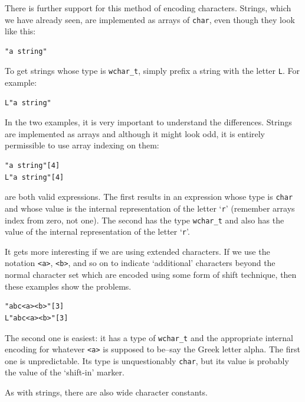     There is further support for this method of encoding characters.
     Strings, which we have already seen, are implemented as arrays of
     \texttt{char}, even though they look like this:


    \begin{Verbatim}
"a string"
\end{Verbatim}

    To get strings whose type is \texttt{wchar\_t}, simply prefix a
     string with the letter \texttt{L}. For example:


    \begin{Verbatim}
L"a string"
\end{Verbatim}

    In the two examples, it is very important to understand the
     differences. Strings are implemented as arrays and although it might look
     odd, it is entirely permissible to use array indexing on them:


    \begin{Verbatim}
"a string"[4]
L"a string"[4]
\end{Verbatim}

    are both valid expressions. The first results in an expression whose
     type is \texttt{char} and whose value is the internal representation
     of the letter `\texttt{r}' (remember arrays index from
     zero, not one). The second has the type \texttt{wchar\_t} and also has
     the value of the internal representation of the
     letter `\texttt{r}'.


    It gets more interesting if we are using extended characters. If we use
     the notation \texttt{<a>}, \texttt{<b>}, and so
     on to indicate `additional' characters beyond the normal character
     set which are encoded using some form of shift technique, then these
     examples show the problems.


    \begin{Verbatim}
"abc<a><b>"[3]
L"abc<a><b>"[3]
\end{Verbatim}

    The second one is easiest: it has a type of \texttt{wchar\_t} and
     the appropriate internal encoding for
     whatever \texttt{<a>} is supposed to be--say the
     Greek letter alpha. The first one is unpredictable. Its type is
     unquestionably \texttt{char}, but its value is probably the value of
     the `shift-in' marker.


    As with strings, there are also wide character constants.


